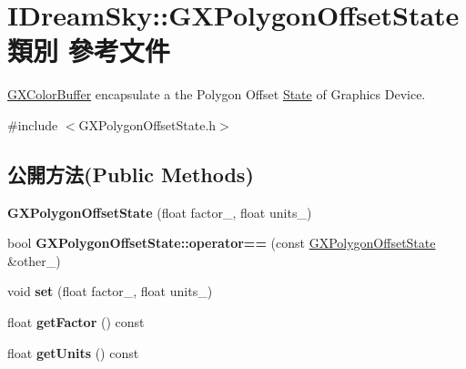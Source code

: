 \hypertarget{class_i_dream_sky_1_1_g_x_polygon_offset_state}{}\section{I\+Dream\+Sky\+:\+:G\+X\+Polygon\+Offset\+State 類別 參考文件}
\label{class_i_dream_sky_1_1_g_x_polygon_offset_state}


\hyperlink{class_i_dream_sky_1_1_g_x_color_buffer}{G\+X\+Color\+Buffer} encapsulate a the Polygon Offset \hyperlink{class_i_dream_sky_1_1_state}{State} of Graphics Device.  




{\ttfamily \#include $<$G\+X\+Polygon\+Offset\+State.\+h$>$}

\subsection*{公開方法(Public Methods)}
\begin{DoxyCompactItemize}
\item 
{\bfseries G\+X\+Polygon\+Offset\+State} (float factor\+\_\+, float units\+\_\+)\hypertarget{class_i_dream_sky_1_1_g_x_polygon_offset_state_a4da71224616598e324541df699416490}{}\label{class_i_dream_sky_1_1_g_x_polygon_offset_state_a4da71224616598e324541df699416490}

\item 
bool {\bfseries G\+X\+Polygon\+Offset\+State\+::operator==} (const \hyperlink{class_i_dream_sky_1_1_g_x_polygon_offset_state}{G\+X\+Polygon\+Offset\+State} \&other\+\_\+)\hypertarget{class_i_dream_sky_1_1_g_x_polygon_offset_state_acda50f2d06983d6a6b288903e30157cd}{}\label{class_i_dream_sky_1_1_g_x_polygon_offset_state_acda50f2d06983d6a6b288903e30157cd}

\item 
void {\bfseries set} (float factor\+\_\+, float units\+\_\+)\hypertarget{class_i_dream_sky_1_1_g_x_polygon_offset_state_aed413355e8c1bbf860ac86bc43e156a9}{}\label{class_i_dream_sky_1_1_g_x_polygon_offset_state_aed413355e8c1bbf860ac86bc43e156a9}

\item 
float {\bfseries get\+Factor} () const \hypertarget{class_i_dream_sky_1_1_g_x_polygon_offset_state_a439e58105354fbc5827f6789c448130c}{}\label{class_i_dream_sky_1_1_g_x_polygon_offset_state_a439e58105354fbc5827f6789c448130c}

\item 
float {\bfseries get\+Units} () const \hypertarget{class_i_dream_sky_1_1_g_x_polygon_offset_state_a368e4a9a1628a154fad21b992335f503}{}\label{class_i_dream_sky_1_1_g_x_polygon_offset_state_a368e4a9a1628a154fad21b992335f503}

\end{DoxyCompactItemize}


